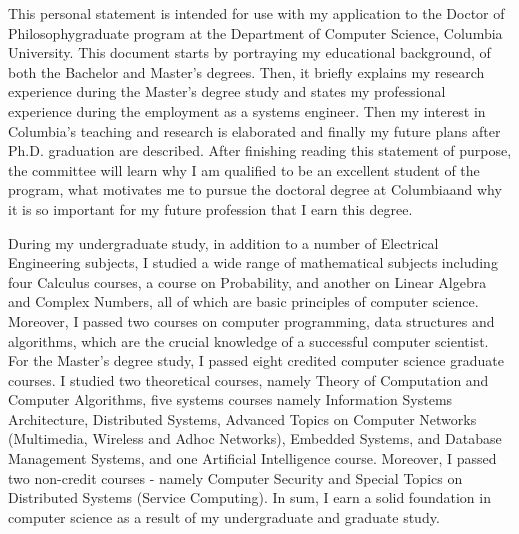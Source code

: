 \documentclass[a4paper,10pt]{report}
\newcommand{\university}{Columbia University}
\newcommand{\department}{Department of Computer Science}
\newcommand{\uniabbre}{Columbia}
\newcommand{\degree}{Doctor of Philosophy}
\begin{document}

\vspace{0.4cm}
This personal statement is intended for use with my application to the \degree \space graduate program at the \department, \university. This document starts by portraying my educational background, of both the Bachelor and Master's degrees. Then, it briefly explains my research experience during the Master's degree study and states my professional experience during the employment as a systems engineer. Then my interest in \uniabbre's teaching and research is elaborated and finally my future plans after Ph.D. graduation are described. After finishing reading this statement of purpose, the committee will learn why I am qualified to be an excellent student of the program, what motivates me to pursue the doctoral degree at \uniabbre \space and why it is so important for my future profession that I earn this degree.

\vspace{0.2cm}
During my undergraduate study, in addition to a number of Electrical Engineering subjects, I studied a wide range of mathematical subjects including four Calculus courses, a course on Probability, and another on Linear Algebra and Complex Numbers, all of which are basic principles of computer science. Moreover, I passed two courses on computer programming, data structures and algorithms, which are the crucial knowledge of a successful computer scientist. For the Master's degree study, I passed eight credited computer science graduate courses. I studied two theoretical courses, namely Theory of Computation and Computer Algorithms, five systems courses namely Information Systems Architecture, Distributed Systems, Advanced Topics on Computer Networks (Multimedia, Wireless and Adhoc Networks), Embedded Systems, and Database Management Systems, and one Artificial Intelligence course. Moreover, I passed two non-credit courses - namely Computer Security and Special Topics on Distributed Systems (Service Computing). In sum, I earn a solid foundation in computer science as a result of my undergraduate and graduate study. 
\end{document}
